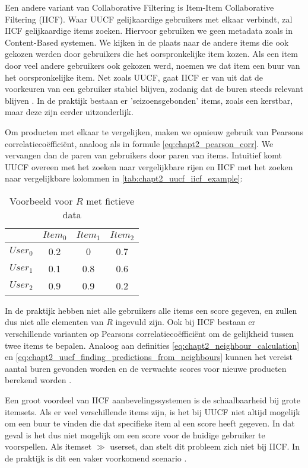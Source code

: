 Een andere variant van Collaborative Filtering is Item-Item Collaborative Filtering (IICF). Waar UUCF gelijkaardige gebruikers met elkaar verbindt, zal IICF gelijkaardige items zoeken. \cite{IICF_original_paper} Hiervoor gebruiken we geen metadata zoals in Content-Based systemen. We kijken in de plaats naar de andere items die ook gekozen werden door gebruikers die het oorspronkelijke item kozen. Als een item door veel andere gebruikers ook gekozen werd, noemen we dat item een buur van het oorspronkelijke item. Net zoals UUCF, gaat IICF er van uit dat de voorkeuren van een gebruiker stabiel blijven, zodanig dat de buren steeds relevant blijven \cite{cursus_hs9}. In de praktijk bestaan er 'seizoensgebonden' items, zoals een kerstbar, maar deze zijn eerder uitzonderlijk.

Om producten met elkaar te vergelijken, maken we opnieuw gebruik van Pearsons correlatiecoëfficiënt, analoog als in formule \ref{eq:chapt2_pearson_corr}. We vervangen dan de paren van gebruikers door paren van items.
Intuïtief komt UUCF overeen met het zoeken naar vergelijkbare rijen en IICF met het zoeken naar vergelijkbare kolommen in \autoref{tab:chapt2_uucf_iicf_example}:

\begin{table}[H]
\centering
\begin{tabular}{c|ccc}
         & $Item_0$ & $Item_1$ & $Item_2$ \\ \hline
$User_0$ & 0.2      & 0        & 0.7      \\
$User_1$ & 0.1      & 0.8      & 0.6      \\
$User_2$ & 0.9      & 0.9      & 0.2     
\end{tabular}
\caption{Voorbeeld voor $R$ met fictieve data}
\label{tab:chapt2_uucf_iicf_example}
\end{table}

In de praktijk hebben niet alle gebruikers alle items een score gegeven, en zullen dus niet alle elementen van $R$ ingevuld zijn. Ook bij IICF bestaan er verschillende varianten op Pearsons correlatiecoëfficiënt om de gelijkheid tussen twee items te bepalen. Analoog aan definities \ref{eq:chapt2_neighbour_calculation} en \ref{eq:chapt2_uucf_finding_predictions_from_neighbours} kunnen het vereist aantal buren gevonden worden en de verwachte scores voor nieuwe producten berekend worden \cite{IICF_original_paper}.

Een groot voordeel van IICF aanbevelingssystemen is de schaalbaarheid bij grote itemsets. Als er veel verschillende items zijn, is het bij UUCF niet altijd mogelijk om een buur te vinden die dat specifieke item al een score heeft gegeven. In dat geval is het dus niet mogelijk om een score voor de huidige gebruiker te voorspellen. Als itemset $\gg$ userset, dan stelt dit probleem zich niet bij IICF. In de praktijk is dit een vaker voorkomend scenario \cite{recsys_handbook}.

